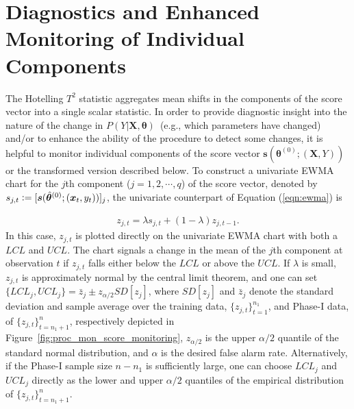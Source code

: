 \documentclass[twoside,11pt]{article}
\begin{document}
\section{Diagnostics and Enhanced Monitoring of Individual Components}
\label{s:decou_cd}
The Hotelling $T^2$ statistic aggregates mean shifts in the components of the score vector into a single scalar statistic. In order to provide diagnostic insight into the nature of the change in $P(Y| \bm {X}, \bm{\theta})$~(e.g., which parameters have changed) and/or to enhance the ability of the procedure to detect some changes, it is helpful to monitor individual components of the score vector $\bm{s}(\bm { \theta}^{ (0)}; (\bm {X}, Y))$ or the transformed version described below. To construct a univariate EWMA chart for the $j$th component ($j=1,2,\cdots,q$) of the score vector, denoted by $s_{j,t} \vcentcolon= [\bm{s}(\hat{\bm { \theta}}^{(0)};(\bm {x}_t, y_t))]_j$, the univariate counterpart of Equation (\ref{eqn:ewma}) is

\begin{align}
z_{j,t} = \lambda s_{j,t} + (1 - \lambda) z_{j,t-1}.
\label{eqn:uniewma}
\end{align}
In this case, $z_{j,t}$ is plotted directly on the univariate EWMA chart with both a $LCL$ and $UCL$. The chart signals a change in the mean of the $j$th component at observation $t$ if $z_{j,t}$ falls either below the $LCL$ or above the $UCL$. If $\lambda$ is small, $z_{j,t}$ is approximately normal by the central limit theorem, and one can set  $\{LCL_j,UCL_j\} = \bar{z}_j \pm z_{\alpha/2}SD[z_j]$, where $SD[z_j]$ and $\bar{z}_j$ denote the standard deviation and sample average over the training data, $\{z_{j,t}\}_{t=1}^{n_1}$, and Phase-I data, of $\{z_{j,t}\}_{t=n_1+1}^n$, respectively depicted in Figure~\ref{fig:proc_mon_score_monitoring}, $z_{\alpha/2}$ is the upper $\alpha/2$ quantile of the standard normal distribution, and $\alpha$ is the desired false alarm rate. Alternatively, if the Phase-I sample size $n-n_1$ is sufficiently large, one can choose $LCL_j$ and $UCL_j$ directly as the lower and upper $\alpha/2$ quantiles of the empirical distribution of $\{z_{j,t}\}_{t=n_1+1}^n$. 
\end{document}
